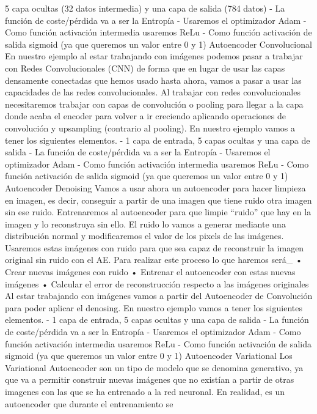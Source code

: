 \documentclass[
  a4paper,
  DIV=11,
  numbers=noendperiod]{scrreprt}
\begin{document}
5 capa ocultas (32 datos intermedia) y una capa de salida (784 datos) -
La función de coste/pérdida va a ser la Entropía - Usaremos el
optimizador Adam - Como función activación intermedia usaremos ReLu -
Como función activación de salida sigmoid (ya que queremos un valor
entre 0 y 1) Autoencoder Convolucional En nuestro ejemplo al estar
trabajando con imágenes podemos pasar a trabajar con Redes
Convolucionales (CNN) de forma que en lugar de usar las capas densamente
conectadas que hemos usado hasta ahora, vamos a pasar a usar las
capacidades de las redes convolucionales. Al trabajar con redes
convolucionales necesitaremos trabajar con capas de convolución o
pooling para llegar a la capa donde acaba el encoder para volver a ir
creciendo aplicando operaciones de convolución y upsampling (contrario
al pooling). En nuestro ejemplo vamos a tener los siguientes elementos.
- 1 capa de entrada, 5 capas ocultas y una capa de salida - La función
de coste/pérdida va a ser la Entropía - Usaremos el optimizador Adam -
Como función activación intermedia usaremos ReLu - Como función
activación de salida sigmoid (ya que queremos un valor entre 0 y 1)
Autoencoder Denoising Vamos a usar ahora un autoencoder para hacer
limpieza en imagen, es decir, conseguir a partir de una imagen que tiene
ruido otra imagen sin ese ruido. Entrenaremos al autoencoder para que
limpie ``ruido'' que hay en la imagen y lo reconstruya sin ello. El
ruido lo vamos a generar mediante una distribución normal y
modificaremos el valor de los pixels de las imágenes. Usaremos estas
imágenes con ruido para que sea capaz de reconstruir la imagen original
sin ruido con el AE. Para realizar este proceso lo que haremos será\_ •
Crear nuevas imágenes con ruido • Entrenar el autoencoder con estas
nuevas imágenes • Calcular el error de reconstrucción respecto a las
imágenes originales Al estar trabajando con imágenes vamos a partir del
Autoencoder de Convolución para poder aplicar el denosing. En nuestro
ejemplo vamos a tener los siguientes elementos. - 1 capa de entrada, 5
capas ocultas y una capa de salida - La función de coste/pérdida va a
ser la Entropía - Usaremos el optimizador Adam - Como función activación
intermedia usaremos ReLu - Como función activación de salida sigmoid (ya
que queremos un valor entre 0 y 1) Autoencoder Variational Los
Variational Autoencoder son un tipo de modelo que se denomina
generativo, ya que va a permitir construir nuevas imágenes que no
existían a partir de otras imagenes con las que se ha entrenado a la red
neuronal. En realidad, es un autoencoder que durante el entrenamiento se
\end{document}
